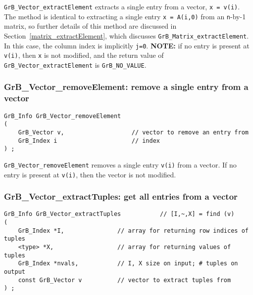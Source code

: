 \documentclass[12pt]{article}
\begin{document}
\verb'GrB_Vector_extractElement' extracts a single entry from a vector,
\verb'x = v(i)'.  The method is identical to extracting a single entry
\verb'x = A(i,0)' from an \verb'n'-by-1 matrix, so further details of this
method are discussed in Section~\ref{matrix_extractElement}, which discusses
\verb'GrB_Matrix_extractElement'.  In this case, the column index is implicitly
\verb'j=0'.
{\bf NOTE: }  if no entry is present at \verb'v(i)', then
\verb'x' is not modified, and the return value of
\verb'GrB_Vector_extractElement' is \verb'GrB_NO_VALUE'.

\subsubsection{{\sf GrB\_Vector\_removeElement:} remove a single entry from a vector}
\label{vector_removeElement}

\begin{mdframed}[userdefinedwidth=6in]
{\footnotesize
\begin{verbatim}
GrB_Info GrB_Vector_removeElement
(
    GrB_Vector v,                   // vector to remove an entry from
    GrB_Index i                     // index
) ;
\end{verbatim} } \end{mdframed}

\verb'GrB_Vector_removeElement' removes a single entry \verb'v(i)' from a vector.
If no entry is present at \verb'v(i)', then the vector is not modified.

\subsubsection{{\sf GrB\_Vector\_extractTuples:} get all entries from a vector}
\label{vector_extractTuples}

\begin{mdframed}[userdefinedwidth=6in]
{\footnotesize
\begin{verbatim}
GrB_Info GrB_Vector_extractTuples           // [I,~,X] = find (v)
(
    GrB_Index *I,               // array for returning row indices of tuples
    <type> *X,                  // array for returning values of tuples
    GrB_Index *nvals,           // I, X size on input; # tuples on output
    const GrB_Vector v          // vector to extract tuples from
) ;
\end{verbatim} } \end{mdframed}
\end{document}
